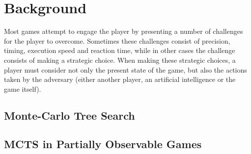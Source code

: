 \section{Background}
\label{02}
Most games attempt to engage the player by presenting a number of challenges for the player to overcome. Sometimes these challenges consist of precision, timing, execution speed and reaction time, while in other cases the challenge consists of making a strategic choice. When making these strategic choices, a player must consider not only the present state of the game, but also the actions taken by the adversary (either another player, an artificial intelligence or the game itself). 



\subsection{Monte-Carlo Tree Search}
\label{02_MCTS}

\subsection{MCTS in Partially Observable Games}



